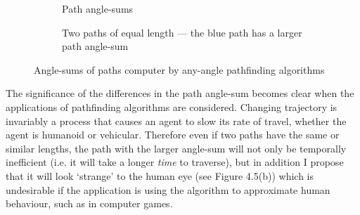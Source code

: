 \documentclass[12pt,notitlepage]{report}
\begin{document}
\begin{figure}
\centering
  \begin{subfigure}[b]{0.49\textwidth}
  \centering
  
  \caption{Path angle-sums}
  \end{subfigure}
  \begin{subfigure}[b]{0.49\textwidth}
  \centering
  \caption{Two paths of equal length --- the blue path has a larger path angle-sum}
  \end{subfigure}
\caption{Angle-sums of paths computer by any-angle pathfinding algorithms}
\end{figure}

\noindent
The significance of the differences in the path angle-sum becomes clear when the applications of pathfinding algorithms are considered. Changing trajectory is invariably a process that causes an agent to slow its rate of travel, whether the agent is humanoid or vehicular. Therefore even if two paths have the same or similar lengths, the path with the larger angle-sum will not only be temporally inefficient (i.e. it will take a longer {\em time} to traverse), but in addition I propose that it will look `strange' to the human eye (see Figure 4.5(b)) which is undesirable if the application is using the algorithm to approximate human behaviour, such as in computer games.\\
\end{document}
